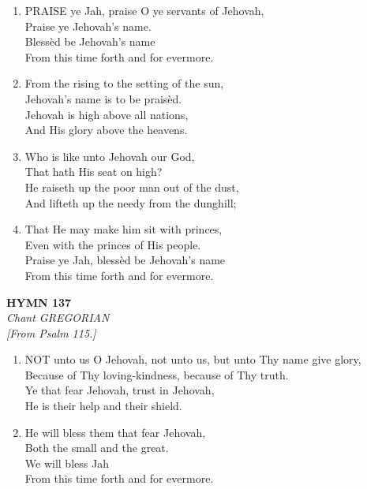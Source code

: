 \begin{enumerate}
    \item PRAISE ye Jah, praise O ye servants of Jehovah, \\
        Praise ye Jehovah's name. \\
        Bless\`ed be Jehovah's name \\
        From this time forth and for evermore.

    \item From the rising to the setting of the sun, \\
        Jehovah's name is to be prais\`ed. \\
        Jehovah is high above all nations, \\
        And His glory above the heavens.

    \item Who is like unto Jehovah our God, \\
        That hath His seat on high? \\
        He raiseth up the poor man out of the dust, \\
        And lifteth up the needy from the dunghill;

    \item That He may make him sit with princes, \\
        Even with the princes of His people. \\
        Praise ye Jah, bless\`ed be Jehovah's name \\
        From this time forth and for evermore.

\end{enumerate}

\newpage
\begin{center}
    {\Large \textbf{HYMN 137}}
    \\
    \textit{Chant GREGORIAN}
    \\
    \textit{\small [From Psalm 115.]}
\end{center}
\vspace{1em}

\begin{enumerate}
    \item NOT unto us O Jehovah, not unto us, but unto Thy name give glory, \\
        Because of Thy loving-kindness, because of Thy truth. \\
        Ye that fear Jehovah, trust in Jehovah, \\
        He is their help and their shield.

    \item He will bless them that fear Jehovah, \\
        Both the small and the great. \\
        We will bless Jah \\
        From this time forth and for evermore.

\end{enumerate}

